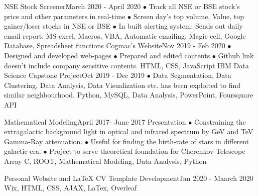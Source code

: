 \begin{projects}
     
    \project
    {NSE Stock Screener}{March 2020 - April 2020}
    {}
    {$\bullet$ Track all NSE or BSE stock's price and other parameters in real-time $\bullet$ Screen day's top volume, Value, top gainer/loser stocks in NSE or BSE $\bullet$ In built alerting system: Sends out daily email report.}
    {MS excel, Macros, VBA, Automatic emailing, Magic-cell, Google Database, Spreadsheet functions}
   \project   
    {Cogmac's Website}{Nov 2019 - Feb 2020}
    { }
    {$\bullet$Designed and developed web-pages $\bullet$ Prepared and edited contents $\bullet$ Github link doesn't include company sensitive contents.}
    {HTML, CSS, JavaScript}
    \project
    {IBM Data Science Capstone Project}{Oct 2019 - Dec 2019}
    {  }
    {$\bullet$ Data Segmentation, Data Clustering, Data Analysis, Data Visualization etc. has been exploited to find similar neighbourhood.}
    {Python, MySQL, Data Analysis, PowerPoint, Foursquare API}
    
   \project
    {Mathematical Modeling}{April 2017- June 2017}
    {  {Presentation} }
    {$\bullet$ Constraining the extragalactic background light in optical and infrared spectrum by GeV and TeV Gamma-Ray attenuation. $\bullet$ Useful for finding the birth-rate of stars in different galactic era. $\bullet$ Project to serve theoretical foundation for Cherenkov Telescope Array}
    {C, ROOT, Mathematical Modeling, Data Analysis, Python}
    
   \project   
    {Personal Website and LaTeX CV Template Development}{Jan 2020 - Maarch 2020}
    { }
    {\vspace*{-10px}}
    {Wix, HTML, CSS, AJAX, LaTex, Overleaf}
        
\end{projects}